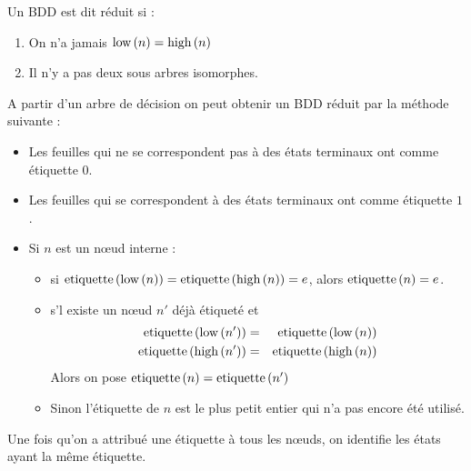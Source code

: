 \begin{definition}
	Un BDD est dit réduit si :
	\begin{enumerate}
		\item On n'a jamais $\text{low}\left(n\right) = \text{high}\left(n\right)$
		\item Il n'y a pas deux sous arbres isomorphes.
	\end{enumerate}
\end{definition}

A partir d'un arbre de décision on peut obtenir un BDD réduit par la méthode suivante :
\begin{itemize}
	\item Les feuilles qui ne se correspondent pas à des états terminaux ont comme étiquette $0$.
	\item Les feuilles qui se correspondent à des états terminaux ont comme étiquette $1$.
	\item Si $n$ est un nœud interne :
	      \begin{itemize}
		      \item si $\text{etiquette}\left(\text{low}\left(n\right)\right) = \text{etiquette}\left(\text{high}\left(n\right)\right) = e$, alors $\text{etiquette}\left(n\right) = e$.
		      \item s'l existe un nœud $n'$ déjà étiqueté et \tq
		            \begin{eqnarray*}
			            \text{etiquette}\left(\text{low}\left(n'\right)\right) &=& \text{etiquette}\left(\text{low}\left(n\right)\right) \\
			            \text{etiquette}\left(\text{high}\left(n'\right)\right) &=& \text{etiquette}\left(\text{high}\left(n\right)\right)
		            \end{eqnarray*}
		            Alors on pose $\text{etiquette}\left(n\right) = \text{etiquette}\left(n'\right)$
		      \item Sinon l'étiquette de $n$ est le plus petit entier qui n'a pas encore été utilisé.
	      \end{itemize}
\end{itemize}

Une fois qu'on a attribué une étiquette à tous les nœuds, on identifie les états ayant la même étiquette.



